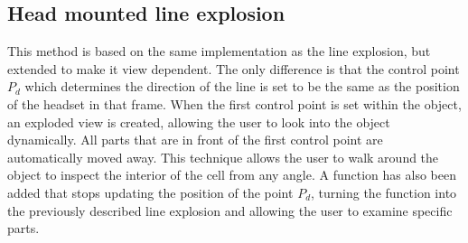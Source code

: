 \subsection{Head mounted line explosion}
This method is based on the same implementation as the line explosion, but extended to make it view dependent. 
The only difference is that the control point $P_d$ which determines the direction of the line is set to be the same as the position of the headset in that frame. 
When the first control point is set within the object, an exploded view is created, allowing the user to look into the object dynamically. 
All parts that are in front of the first control point are automatically moved away. 
This technique allows the user to walk around the object to inspect the interior of the cell from any angle.
A function has also been added that stops updating the position of the point $P_d$, turning the function into the previously described line explosion and allowing the user to examine specific parts. 

